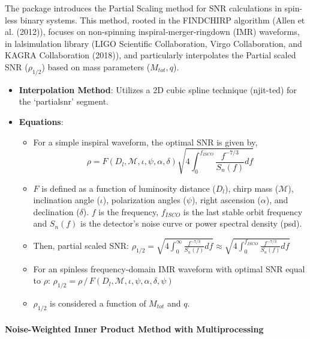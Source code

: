 \documentclass[10pt,a4paper,onecolumn]{article}
\let\textttOrig=\texttt
\def\texttt#1{\expandafter\textttOrig{\seqsplit{#1}}}
\let\oldparagraph\paragraph
\renewcommand{\paragraph}[1]{\oldparagraph{#1}\mbox{}}
\begin{document}
The \emph{\texttt{gwsnr}} package introduces the Partial Scaling method
for SNR calculations in spin-less binary systems. This method, rooted in
the FINDCHIRP algorithm (Allen et al. (2012)), focuses on non-spinning
inspiral-merger-ringdown (IMR) waveforms, in lalsimulation library (LIGO
Scientific Collaboration, Virgo Collaboration, and KAGRA Collaboration
(2018)), and particularly interpolates the Partial scaled SNR
(\(\rho_{1/2}\)) based on mass parameters (\(M_{tot},q\)).

\begin{itemize}
\item
  \textbf{Interpolation Method}: Utilizes a 2D cubic spline technique
  (njit-ted) for the `partialsnr' segment.
\item
  \textbf{Equations}:

  \begin{itemize}
  \item
    For a simple inspiral waveform, the optimal SNR is given by,
    \[\rho = F(D_l,\mathcal{M},\iota,\psi,\alpha, \delta) \sqrt{ 4\int_0^{f_{ISCO}} \frac{f^{-7/3}}{S_n(f)}df }\]
  \item
    \(F\) is defined as a function of luminosity distance (\(D_l\)),
    chirp mass (\(\mathcal{M}\)), inclination angle (\(\iota\)),
    polarization angles (\(\psi\)), right ascension (\(\alpha\)), and
    declination (\(\delta\)). \(f\) is the frequency, \(f_{ISCO}\) is
    the last stable orbit frequency and \(S_n(f)\) is the detector's
    noise curve or power spectral density (psd).
  \item
    Then, partial scaled SNR:
    \(\rho_{1/2} = \sqrt{ 4\int_0^\infty \frac{f^{-7/3}}{S_n(f)}df } \approx \sqrt{ 4\int_0^{f_{ISCO}} \frac{f^{-7/3}}{S_n(f)}df }\)
  \item
    For an spinless frequency-domain IMR waveform with optimal SNR equal
    to \(\rho\):
    \(\rho_{1/2} = \rho\,/\, F(D_l,\mathcal{M},\iota,\psi,\alpha, \delta, \psi)\)
  \item
    \(\rho_{1/2}\) is considered a function of \(M_{tot}\) and \(q\).
  \end{itemize}
\end{itemize}

\paragraph{Noise-Weighted Inner Product Method with
Multiprocessing}\label{noise-weighted-inner-product-method-with-multiprocessing}
\end{document}
